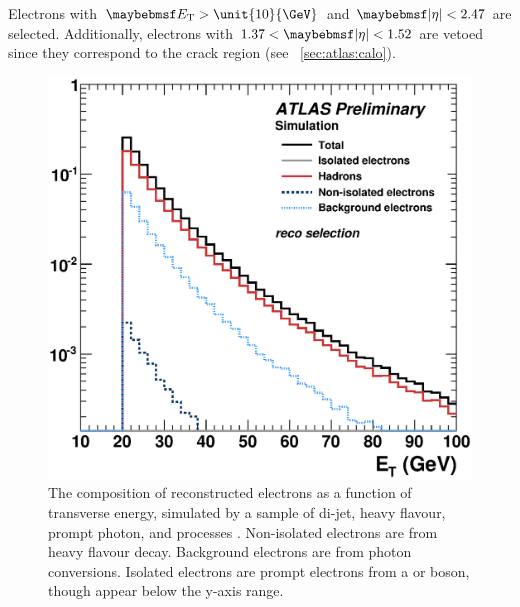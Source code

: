 Electrons with $\et > \unit{10}{\GeV}$ and $\mods{\eta} < 2.47$ are selected. Additionally, electrons with $1.37 < \mods{\eta} < 1.52$ are vetoed since they correspond
to the crack region (see \Section~\ref{sec:atlas:calo}).

\begin{figure}
	\includegraphics[width=\smallfigwidth]{tex/selection/electron_composition}
	\caption{The composition of reconstructed electrons as a function of transverse 
	energy, simulated by a  sample of di-jet, heavy flavour, prompt photon, \PW 
	and \PZ processes \cite{ElectronPerf:Expect}. Non-isolated electrons are from heavy 
	flavour decay. Background electrons are from photon conversions. Isolated electrons 
	are prompt electrons from a \PW or \PZ boson, though appear below the y-axis range.}
	\label{fig:objects:el_composition}
\end{figure}

